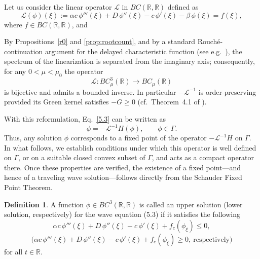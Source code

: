 \documentclass[12pt,letterpaper]{amsart}
\theoremstyle{definition}
\newtheorem{definition}[theorem]{Definition}
\theoremstyle{remark}
\numberwithin{equation}{section}
\begin{document}
 




  
  
  
 Let us consider the linear operator 
 $\mathcal{L}$ in $BC(\mathbb{R}, \mathbb{R})$ defined as
 \begin{equation}\label{5.5}
 	\mathcal{L}(\phi)(\xi) :=  	\alpha c\,\phi'''(\xi) + D\,\phi''(\xi) -c\,\phi'(\xi) - \beta\,\phi(\xi)     = f(\xi), 
 \end{equation}
 where $f \in BC(\mathbb{R}, \mathbb{R})$, and
 
 
 
 
 By Propositions~\ref{r0} and \ref{prop:rootcount}, and by a standard Rouché-continuation argument for the delayed characteristic function (see e.g.\ \cite{Diekmann,ma}), the spectrum of the linearization is separated from the imaginary axis; consequently, for any $0<\mu<\mu_0$ the operator
 \[
 \mathcal L:BC^3_\mu(\mathbb R)\to BC_\mu(\mathbb R)
 \]
 is bijective and admits a bounded inverse. In particular $-\mathcal L^{-1}$ is order-preserving provided its Green kernel satisfies $-G\ge0$ (cf.\ Theorem~4.1 of \cite{wuzou}).
 
 
 
 
 
 
 
 
 
 
 
  
 With this reformulation, Eq.~\eqref{5.3} can be written as
 \begin{equation}\label{5.7}
 	\phi = -\mathcal{L}^{-1} H(\phi), \qquad \phi \in \Gamma.
 \end{equation}
 Thus, any solution $\phi$ corresponds to a fixed point of the operator
 $-\mathcal{L}^{-1}H$ on $\Gamma$. In what follows, we establish conditions
 under which this operator is well defined on $\Gamma$, or on a suitable
 closed convex subset of $\Gamma$, and acts as a compact operator there.
 Once these properties are verified, the existence of a fixed point---and
 hence of a traveling wave solution---follows directly from the
 Schauder Fixed Point Theorem.
 
 \begin{definition} \label{df5.2}
 	A function $\phi \in BC^3(\mathbb{R},\mathbb{R})$ is called an upper solution 
 	(lower solution, respectively) for the wave equation (5.3) if it satisfies the following
  	 \begin{equation*} 
 		\alpha c\,\phi'''(\xi) + D\,\phi''(\xi) -c\,\phi'(\xi)    + f_c(\phi_{\xi}) \leq 0,
 	\end{equation*}
 	\[
 	\big(\alpha c\,\phi'''(\xi ) + D\,\phi''(\xi) -c\,\phi'(\xi)    + f_c(\phi_{\xi}) \geq 0, \ \text{respectively}\big)
 	\]
 	for all $t \in \mathbb{R}$.
 \end{definition}
 
\end{document}
